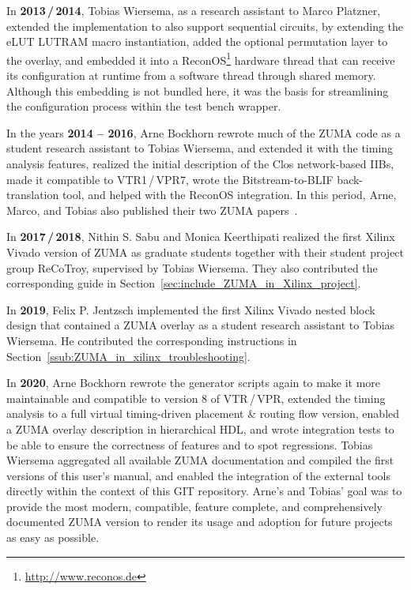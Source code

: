 \documentclass{article}
\begin{document}
In \textbf{2013\,/\,2014}, Tobias Wiersema, as a research assistant to Marco Platzner, extended the implementation to also support sequential circuits, by extending the eLUT LUTRAM macro instantiation, added the optional permutation layer to the overlay, and embedded it into a ReconOS\footnote{\url{http://www.reconos.de}} hardware thread that can receive its configuration at runtime from a software thread through shared memory. Although this embedding is not bundled here, it was the basis for streamlining the configuration process within the test bench wrapper.

In the years \textbf{2014 -- 2016}, Arne Bockhorn rewrote much of the ZUMA code as a student research assistant to Tobias Wiersema, and extended it with the timing analysis features, realized the initial description of the Clos network-based IIBs, made it compatible to VTR1\,/\,VPR7, wrote the Bitstream-to-BLIF back-translation tool, and helped with the ReconOS integration.
In this period, Arne, Marco, and Tobias also published their two ZUMA papers~\cite{wiersemaBP2014ZUMAReconOS,wiersemaBP2016ZUMAReconOS}.

In \textbf{2017\,/\,2018}, Nithin S. Sabu and Monica Keerthipati realized the first Xilinx Vivado version of ZUMA as graduate students together with their student project group ReCoTroy, supervised by Tobias Wiersema. They also contributed the corresponding guide in Section~\ref{sec:include_ZUMA_in_Xilinx_project}.

In \textbf{2019}, Felix P. Jentzsch implemented the first Xilinx Vivado nested block design that contained a ZUMA overlay as a student research assistant to Tobias Wiersema. He contributed the corresponding instructions in Section~\ref{ssub:ZUMA_in_xilinx_troubleshooting}.

In \textbf{2020}, Arne Bockhorn rewrote the generator scripts again to make it more maintainable and compatible to version 8 of VTR\,/\,VPR, extended the timing analysis to a full virtual timing-driven placement \& routing flow version, enabled a ZUMA overlay description in hierarchical HDL, and wrote integration tests to be able to ensure the correctness of features and to spot regressions.
Tobias Wiersema aggregated all available ZUMA documentation and compiled the first versions of this user's manual, and enabled the integration of the external tools directly within the context of this GIT repository.
Arne's and Tobias' goal was to provide the most modern, compatible, feature complete, and comprehensively documented ZUMA version to render its usage and adoption for future projects as easy as possible.
\end{document}
